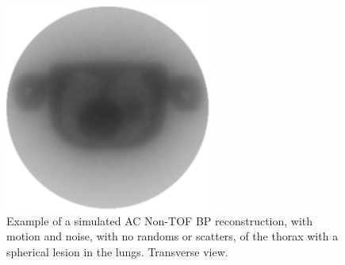             \begin{figure}
                \centering
                
                \includegraphics[width=1.0\linewidth]{figures/background_bp_example.png}
                
                \captionsetup{singlelinecheck=false}
                \caption{
                    Example of a simulated \gls{AC} \gls{Non-TOF} \gls{BP} reconstruction, with motion and noise, with no randoms or scatters, of the thorax with a spherical lesion in the lungs. Transverse view.
                }
                \label{fig:analytic_image_reconstruction_bp_example}
            \end{figure}
            
